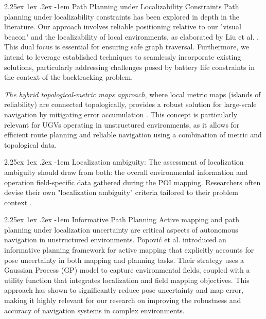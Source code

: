 \documentclass[runningheads]{llncs}
\makeatletter
\renewcommand\paragraph{\@startsection{paragraph}{4}{\z@}%
                                    {2.25ex \@plus1ex \@minus.2ex}%
                                    {-1em}%
                                    {\normalfont\normalsize\bfseries}}
\makeatother
\begin{document}
\paragraph{Path Planning under Localizability Constraints}
Path planning under localizability constraints has been explored in depth in the literature. Our approach involves reliable positioning relative to our "visual beacon" and the localizability of local environments, as elaborated by Liu et al. \cite{LocalizabilityPathPlanning}. This dual focus is essential for ensuring safe graph traversal. Furthermore, we intend to leverage established techniques to seamlessly incorporate existing solutions, particularly addressing challenges posed by battery life constraints in the context of the backtracking problem.

\textit{The hybrid topological-metric maps approach}, where local metric maps (islands of reliability) are connected topologically, provides a robust solution for large-scale navigation by mitigating error accumulation \cite{HybridTopoMetricMaps}. This concept is particularly relevant for UGVs operating in unstructured environments, as it allows for efficient route planning and reliable navigation using a combination of metric and topological data.

\paragraph{Localization ambiguity}:
The assessment of localization ambiguity should draw from both: the overall environmental information and operation field-specific data gathered during the POI mapping. Researchers often devise their own "localization ambiguity" criteria tailored to their problem context \cite{AmbiguityGridMap} \cite{LandmarksEffectivenessExperiment}.

\paragraph{Informative Path Planning}
Active mapping and path planning under localization uncertainty are critical aspects of autonomous navigation in unstructured environments. Popović et al. \cite{InformativePathPlannin_under_uncertainty} introduced an informative planning framework for active mapping that explicitly accounts for pose uncertainty in both mapping and planning tasks. Their strategy uses a Gaussian Process (GP) model to capture environmental fields, coupled with a utility function that integrates localization and field mapping objectives. This approach has shown to significantly reduce pose uncertainty and map error, making it highly relevant for our research on improving the robustness and accuracy of navigation systems in complex environments.
\end{document}
